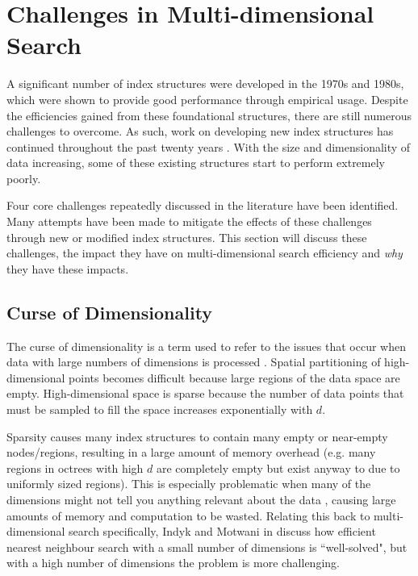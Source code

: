 \section{Challenges in Multi-dimensional Search}
\label{sec:challenges}

A significant number of index structures were developed in the 1970s and 1980s, which were shown to provide good performance through empirical usage. Despite the efficiencies gained from these foundational structures, there are still numerous challenges to overcome. As such, work on developing new index structures has continued throughout the past twenty years \cite{md-structures-samet}. With the size and dimensionality of data increasing, some of these existing structures start to perform extremely poorly.

Four core challenges repeatedly discussed in the literature have been identified. Many attempts have been made to mitigate the effects of these challenges through new or modified index structures. This section will discuss these challenges, the impact they have on multi-dimensional search efficiency and \textit{why} they have these impacts.

\subsection{Curse of Dimensionality}
\label{sec:curse-of-dimensionality}

The curse of dimensionality is a term used to refer to the issues that occur when data with large numbers of dimensions is processed \cite{curse-of-dimensionality}. Spatial partitioning of high-dimensional points becomes difficult because large regions of the data space are empty. High-dimensional space is sparse because the number of data points that must be sampled to fill the space increases exponentially with $d$.

Sparsity causes many index structures to contain many empty or near-empty nodes/regions, resulting in a large amount of memory overhead (e.g. many regions in octrees with high $d$ are completely empty but exist anyway to due to uniformly sized regions). This is especially problematic when many of the dimensions might not tell you anything relevant about the data \cite{irrelevant-dimension}, causing large amounts of memory and computation to be wasted. Relating this back to multi-dimensional search specifically, Indyk and Motwani in \cite{knn-curse-of-dimensionality} discuss how efficient nearest neighbour search with a small number of dimensions is ``well-solved", but with a high number of dimensions the problem is more challenging.

